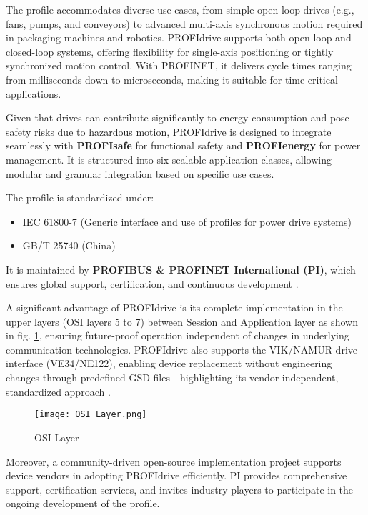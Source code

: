 \documentclass[conference]{IEEEtran}
\begin{document}
The profile accommodates diverse use cases, from simple open-loop drives (e.g., fans, pumps, and conveyors) to advanced multi-axis synchronous motion required in packaging machines and robotics. PROFIdrive supports both open-loop and closed-loop systems, offering flexibility for single-axis positioning or tightly synchronized motion control. With PROFINET, it delivers cycle times ranging from milliseconds down to microseconds, making it suitable for time-critical applications.

Given that drives can contribute significantly to energy consumption and pose safety risks due to hazardous motion, PROFIdrive is designed to integrate seamlessly with \textbf{PROFIsafe} for functional safety and \textbf{PROFIenergy} for power management. It is structured into six scalable application classes, allowing modular and granular integration based on specific use cases.

The profile is standardized under:
\begin{itemize}
    \item IEC 61800-7 (Generic interface and use of profiles for power drive systems)
    \item GB/T 25740 (China)
\end{itemize}
It is maintained by \textbf{PROFIBUS \& PROFINET International (PI)}, which ensures global support, certification, and continuous development \cite{profinet_profidrive}.

A significant advantage of PROFIdrive is its complete implementation in the upper layers (OSI layers 5 to 7) between Session and Application layer as shown in fig. \ref{fig:OSI Layer}, ensuring future-proof operation independent of changes in underlying communication technologies. PROFIdrive also supports the VIK/NAMUR drive interface (VE34/NE122), enabling device replacement without engineering changes through predefined GSD files—highlighting its vendor-independent, standardized approach \cite{profinet_profidrive}.

\begin{figure}[h!]
    \centering
    \texttt{[image: OSI Layer.png]}
    \caption{OSI Layer}
    \label{fig:OSI Layer}
\end{figure}

Moreover, a community-driven open-source implementation project supports device vendors in adopting PROFIdrive efficiently. PI provides comprehensive support, certification services, and invites industry players to participate in the ongoing development of the profile.
\end{document}
